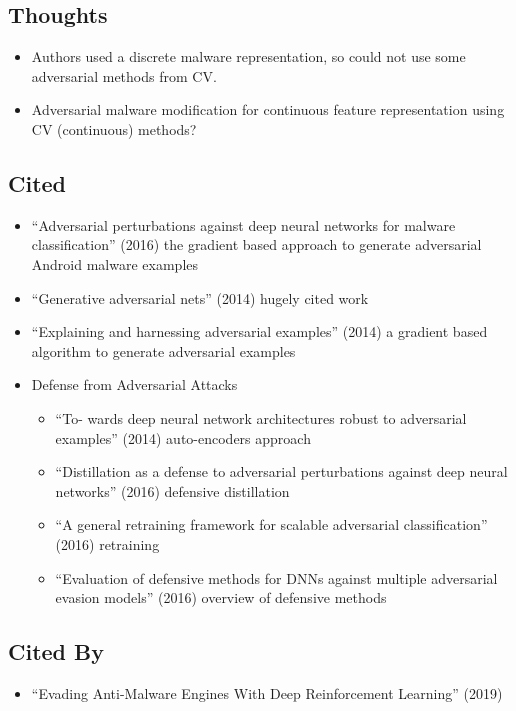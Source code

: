 \documentclass{article}
\begin{document}
\subsection*{Thoughts}
\begin{itemize}
\item Authors used a discrete malware representation, so could not use some adversarial methods from CV.
\item Adversarial malware modification for continuous feature representation using CV (continuous) methods?
\end{itemize}

\subsection*{Cited}
\begin{itemize}
\item ``Adversarial perturbations against deep neural networks for malware classification'' (2016) the gradient based approach to generate adversarial Android malware examples
\item ``Generative adversarial nets'' (2014) hugely cited work
\item ``Explaining and harnessing adversarial examples'' (2014) a gradient based algorithm to generate adversarial examples 
\item Defense from Adversarial Attacks
	\begin{itemize}
	\item ``To- wards deep neural network architectures robust to adversarial examples'' (2014) auto-encoders approach
	\item ``Distillation as a defense to adversarial perturbations against deep neural networks'' (2016) defensive distillation
	\item ``A general retraining framework for scalable adversarial classification'' (2016) retraining
	\item ``Evaluation of defensive methods for DNNs against multiple adversarial evasion models'' (2016) overview of defensive methods
	\end{itemize}
\end{itemize}

\subsection*{Cited By}
\begin{itemize}
\item ``Evading Anti-Malware Engines With Deep Reinforcement Learning'' (2019)
\end{itemize}
\end{document}
